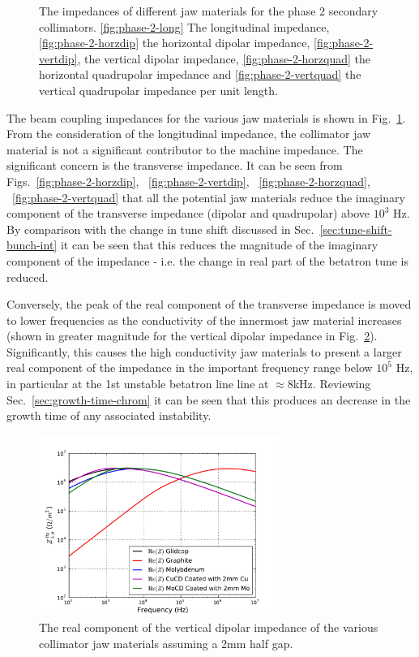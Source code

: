 \begin{figure}
{\label{fig:phase-2-vertquad}
}
\caption{The impedances of different jaw materials for the phase 2 secondary collimators. \ref{fig:phase-2-long} The longitudinal impedance, \ref{fig:phase-2-horzdip} the horizontal dipolar impedance, \ref{fig:phase-2-vertdip}, the vertical dipolar impedance, \ref{fig:phase-2-horzquad} the horizontal quadrupolar impedance and \ref{fig:phase-2-vertquad} the vertical quadrupolar impedance per unit length.}
\label{fig:phase-2-jaw-impedances}
\end{figure}

The beam coupling impedances for the various jaw materials is shown in Fig.~\ref{fig:phase-2-jaw-impedances}. From the consideration of the longitudinal impedance, the collimator jaw material is not a significant contributor to the machine impedance. The significant concern is the transverse impedance. It can be seen from Figs.~\ref{fig:phase-2-horzdip}, ~\ref{fig:phase-2-vertdip}, ~\ref{fig:phase-2-horzquad}, ~\ref{fig:phase-2-vertquad} that all the potential jaw materials reduce the imaginary component of the transverse impedance (dipolar and quadrupolar) above $10^{3}$ Hz. By comparison with the change in tune shift discussed in Sec.~\ref{sec:tune-shift-bunch-int} it can be seen that this reduces the magnitude of the imaginary component of the impedance - i.e. the change in real part of the betatron tune is reduced. 

Conversely, the peak of the real component of the transverse impedance is moved to lower frequencies as the conductivity of the innermost jaw material increases (shown in greater magnitude for the vertical dipolar impedance in Fig.~\ref{fig:phase-2-vertdip-zoom}). Significantly, this causes the high conductivity jaw materials to present a larger real component of the impedance in the important frequency range below $10^{5}$ Hz, in particular at the 1st unstable betatron line line at $\approx8$kHz. Reviewing Sec.~\ref{sec:growth-time-chrom} it can be seen that this produces an decrease in the growth time of any associated instability. 

\begin{figure}
\begin{center}
\includegraphics[width=0.7\textwidth]{LHC_Collimation_Upgrades/figures/vertDipolarZoom.pdf}
\end{center}
\caption{The real component of the vertical dipolar impedance of the various collimator jaw materials assuming a 2mm half gap.}
\label{fig:phase-2-vertdip-zoom}
\end{figure}
